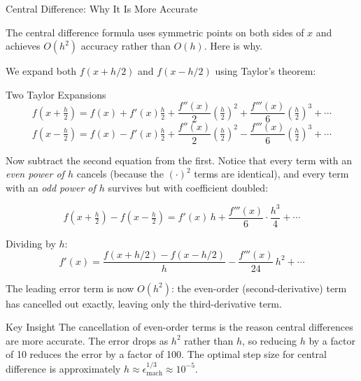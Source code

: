 \documentclass[aspectratio=169,10pt]{beamer}
\begin{document}
\begin{frame}[allowframebreaks]{Central Difference: Why It Is More Accurate}

  The central difference formula uses symmetric points on both sides of $x$
  and achieves $O(h^2)$ accuracy rather than $O(h)$.  Here is why.

  We expand both $f(x+h/2)$ and $f(x-h/2)$ using Taylor's theorem:

  \begin{block}{Two Taylor Expansions}
    \[
      f\!\left(x+\tfrac{h}{2}\right)
      = f(x) + f'(x)\tfrac{h}{2}
      + \frac{f''(x)}{2}\!\left(\tfrac{h}{2}\right)^{\!2}
      + \frac{f'''(x)}{6}\!\left(\tfrac{h}{2}\right)^{\!3} + \cdots
    \]
    \[
      f\!\left(x-\tfrac{h}{2}\right)
      = f(x) - f'(x)\tfrac{h}{2}
      + \frac{f''(x)}{2}\!\left(\tfrac{h}{2}\right)^{\!2}
      - \frac{f'''(x)}{6}\!\left(\tfrac{h}{2}\right)^{\!3} + \cdots
    \]
  \end{block}

  Now subtract the second equation from the first.  Notice that every
  term with an \emph{even power of $h$} cancels (because the
  $(\cdot)^2$ terms are identical), and every term with an
  \emph{odd power of $h$} survives but with coefficient doubled:

  \[
    f\!\left(x+\tfrac{h}{2}\right) - f\!\left(x-\tfrac{h}{2}\right)
    = f'(x)\,h + \frac{f'''(x)}{6}\cdot\frac{h^3}{4} + \cdots
  \]

  Dividing by $h$:
  \[
    f'(x)
    = \frac{f(x+h/2) - f(x-h/2)}{h}
    - \frac{f'''(x)}{24}\,h^2
    + \cdots
  \]

  The leading error term is now $O(h^2)$: the even-order (second-derivative)
  term has cancelled out exactly, leaving only the third-derivative term.

  \begin{alertblock}{Key Insight}
    The cancellation of even-order terms is the reason central differences
    are more accurate.  The error drops as $h^2$ rather than $h$, so
    reducing $h$ by a factor of 10 reduces the error by a factor of 100.
    The optimal step size for central difference is approximately
    $h \approx \epsilon_{\text{mach}}^{1/3} \approx 10^{-5}$.
  \end{alertblock}

\end{frame}
\end{document}
